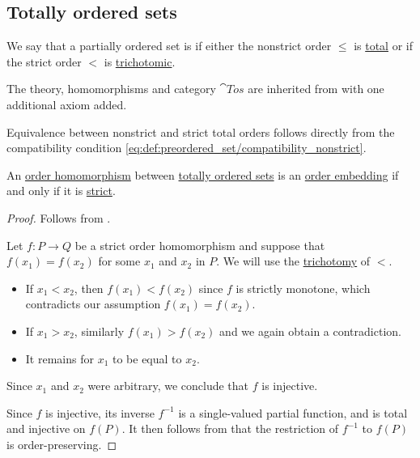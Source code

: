 \subsection{Totally ordered sets}\label{subsec:totally_ordered_sets}

\begin{definition}\label{def:totally_ordered_set}
  We say that a partially ordered set is  if either the nonstrict order \( \leq \) is \hyperref[def:binary_relation/total]{total} or if the strict order \( < \) is \hyperref[def:binary_relation/trichotomic]{trichotomic}.

  The theory, homomorphisms and category \( \cat{Tos} \) are inherited from  with one additional axiom added.
\end{definition}
\begin{defproof}
  Equivalence between nonstrict and strict total orders follows directly from the compatibility condition \eqref{eq:def:preordered_set/compatibility_nonstrict}.
\end{defproof}

\begin{proposition}\label{thm:total_order_embedding_iff_strict}
  An \hyperref[def:order_homomorphism/increasing]{order homomorphism} between \hyperref[def:totally_ordered_set]{totally ordered sets} is an \hyperref[def:order_homomorphism/embedding]{order embedding} if and only if it is \hyperref[def:order_homomorphism/increasing]{strict}.
\end{proposition}
\begin{proof}
  \SufficiencySubProof Follows from .

  \NecessitySubProof
   Let \( f: P \to Q \) be a strict order homomorphism and suppose that \( f(x_1) = f(x_2) \) for some \( x_1 \) and \( x_2 \) in \( P \). We will use the \hyperref[def:binary_relation/trichotomic]{trichotomy} of \( < \).
  \begin{itemize}
    \item If \( x_1 < x_2 \), then \( f(x_1) < f(x_2) \) since \( f \) is strictly monotone, which contradicts our assumption \( f(x_1) = f(x_2) \).

    \item If \( x_1 > x_2 \), similarly \( f(x_1) > f(x_2) \) and we again obtain a contradiction.

    \item It remains for \( x_1 \) to be equal to \( x_2 \).
  \end{itemize}

  Since \( x_1 \) and \( x_2 \) were arbitrary, we conclude that \( f \) is injective.

   Since \( f \) is injective, its inverse \( f^{-1} \) is a single-valued partial function, and is total and injective on \( f(P) \). It then follows from  that the restriction of \( f^{-1} \) to \( f(P) \) is order-preserving.
\end{proof}

